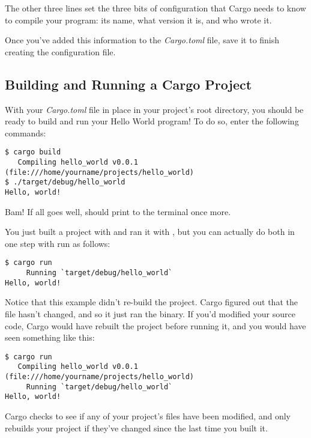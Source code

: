 \blank

The other three lines set the three bits of configuration that Cargo needs to know to compile your program: its name, what 
version it is, and who wrote it.

\blank

Once you've added this information to the \emph{Cargo.toml} file, save it to finish creating the configuration file.

\subsection*{Building and Running a Cargo Project}

With your \emph{Cargo.toml} file in place in your project's root directory, you should be ready to build and run your 
Hello World program! To do so, enter the following commands:

\begin{verbatim}
$ cargo build
   Compiling hello_world v0.0.1 (file:///home/yourname/projects/hello_world)
$ ./target/debug/hello_world
Hello, world! 
\end{verbatim}

Bam! If all goes well,  should print to the terminal once more.

\blank

You just built a project with  and ran it with , but you can actually do 
both in one step with  run as follows:

\begin{verbatim}
$ cargo run
     Running `target/debug/hello_world`
Hello, world!  
\end{verbatim}

Notice that this example didn’t re-build the project. Cargo figured out that the file hasn’t changed, and so it just 
ran the binary. If you'd modified your source code, Cargo would have rebuilt the project before running it, and you 
would have seen something like this:

\begin{verbatim}
$ cargo run
   Compiling hello_world v0.0.1 (file:///home/yourname/projects/hello_world)
     Running `target/debug/hello_world`
Hello, world!  
\end{verbatim}

Cargo checks to see if any of your project’s files have been modified, and only rebuilds your project if they’ve changed since 
the last time you built it.

